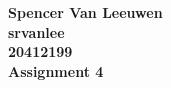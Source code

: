 \documentclass[12pt]{article}
\begin{document}
\begin{center}
{\Large\bf Spencer Van Leeuwen} \\ \vspace{2mm}
{\Large\bf srvanlee} \\ \vspace{2mm}
{\Large\bf 20412199} \\ \vspace{2mm}
{\Large\bf Assignment 4}
\end{center}
\end{document}
